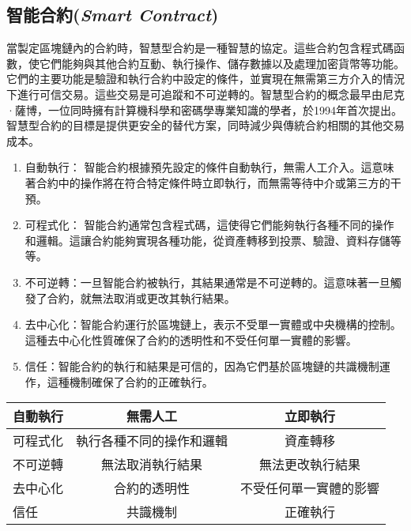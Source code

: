 \documentclass[12pt, a4paper]{article}
\begin{document}
\subsection{智能合約(\textit{Smart Contract})}
當製定區塊鏈內的合約時，智慧型合約是一種智慧的協定。這些合約包含程式碼函數，使它們能夠與其他合約互動、執行操作、儲存數據以及處理加密貨幣等功能。它們的主要功能是驗證和執行合約中設定的條件，並實現在無需第三方介入的情況下進行可信交易。這些交易是可追蹤和不可逆轉的。智慧型合約的概念最早由尼克·薩博，一位同時擁有計算機科學和密碼學專業知識的學者，於1994年首次提出。智慧型合約的目標是提供更安全的替代方案，同時減少與傳統合約相關的其他交易成本。
\begin{enumerate}
\item 自動執行：
智能合約根據預先設定的條件自動執行，無需人工介入。這意味著合約中的操作將在符合特定條件時立即執行，而無需等待中介或第三方的干預。
\item 可程式化：
智能合約通常包含程式碼，這使得它們能夠執行各種不同的操作和邏輯。這讓合約能夠實現各種功能，從資產轉移到投票、驗證、資料存儲等等。
\item 不可逆轉：一旦智能合約被執行，其結果通常是不可逆轉的。這意味著一旦觸發了合約，就無法取消或更改其執行結果。
\item 去中心化：智能合約運行於區塊鏈上，表示不受單一實體或中央機構的控制。這種去中心化性質確保了合約的透明性和不受任何單一實體的影響。
\item 信任：智能合約的執行和結果是可信的，因為它們基於區塊鏈的共識機制運作，這種機制確保了合約的正確執行。
\end{enumerate}
\begin{center}
\begin{tabular}{l|cc}  
\hline
  自動執行	& 無需人工	& 立即執行		\\\hline  
  可程式化    & 執行各種不同的操作和邏輯& 資產轉移\\\hline
  不可逆轉 	& 無法取消執行結果    	& 無法更改執行結果\\\hline
  去中心化    & 合約的透明性&不受任何單一實體的影響\\\hline
  信任       & 共識機制    &正確執行\\\hline
\end{tabular}
\end{center}
\end{document}
